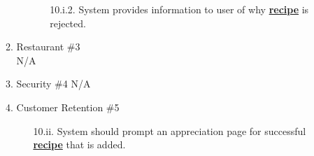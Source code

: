 \documentclass[]{article}
\begin{document}
\begin{enumerate}[{\bf BE1.}]
\begin{enumerate}[{\bf VP1.}]
\begin{enumerate}
\begin{enumerate}
							\item[10.i.2.] System provides information to user of why \hyperref[Recipe]{\textbf{recipe}} is rejected.
						\end{enumerate}
					\end{enumerate}
				\item Restaurant \#3 \\
					N/A
				\item Security \#4 
					N/A
				\item Customer Retention \#5
					\begin{enumerate}
						\item[10.ii.] System should prompt an appreciation page for successful \hyperref[Recipe]{\textbf{recipe}} that is added.
					\end{enumerate}
			\end{enumerate}
	

\end{enumerate}
\end{document}
